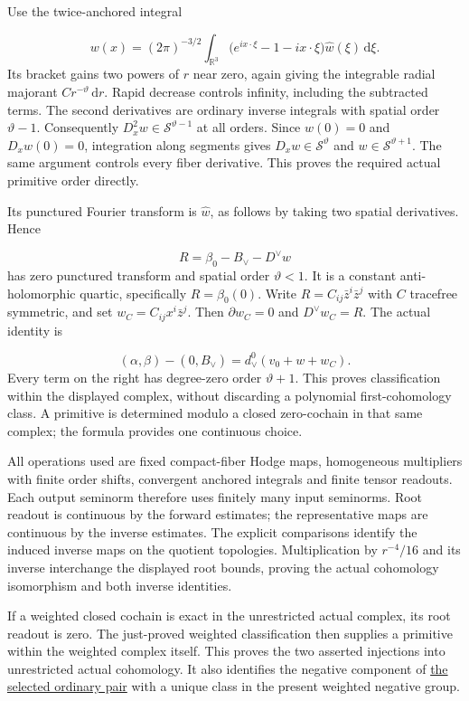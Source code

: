 \documentclass[
  english,
  11pt,
  reqno]{amsart}
\begin{document}
Use the twice-anchored integral

\label{eq:online-dual-twice-anchored-primitive} \[
w(x)=(2\pi)^{-3/2}\int_{\mathbb R^3}
\bigl(e^{ix\cdot\xi}-1-ix\cdot\xi\bigr)
\widehat w(\xi)\,\mathrm d\xi .
\] Its bracket gains two powers of \(r\) near zero, again giving the
integrable radial majorant \(Cr^{-\vartheta}\,\mathrm dr\). Rapid
decrease controls infinity, including the subtracted terms. The second
derivatives are ordinary inverse integrals with spatial order
\(\vartheta-1\). Consequently \(D_x^2w\in\mathscr S^{\vartheta-1}\) at
all orders. Since \(w(0)=0\) and \(D_xw(0)=0\), integration along
segments gives \(D_xw\in\mathscr S^\vartheta\) and
\(w\in\mathscr S^{\vartheta+1}\). The same argument controls every fiber
derivative. This proves the required actual primitive order directly.

Its punctured Fourier transform is \(\widehat w\), as follows by taking
two spatial derivatives. Hence

\label{eq:online-dual-constant-polynomial-residual} \[
R=\beta_0-B_\vee-D^\vee w
\] has zero punctured transform and spatial order \(\vartheta<1\). It is
a constant anti-holomorphic quartic, specifically \(R=\beta_0(0)\).
Write \(R=C_{ij}\bar z^i\bar z^j\) with \(C\) tracefree symmetric, and
set \(w_C=C_{ij}x^i\bar z^j\). Then \(\partial w_C=0\) and
\(D^\vee w_C=R\). The actual identity is

\label{eq:online-dual-actual-comparison-primitive} \[
(\alpha,\beta)-(0,B_\vee)
=d_\vee^0(v_0+w+w_C).
\] Every term on the right has degree-zero order \(\vartheta+1\). This
proves classification within the displayed complex, without discarding a
polynomial first-cohomology class. A primitive is determined modulo a
closed zero-cochain in that same complex; the formula provides one
continuous choice.

All operations used are fixed compact-fiber Hodge maps, homogeneous
multipliers with finite order shifts, convergent anchored integrals and
finite tensor readouts. Each output seminorm therefore uses finitely
many input seminorms. Root readout is continuous by the forward
estimates; the representative maps are continuous by the inverse
estimates. The explicit comparisons identify the induced inverse maps on
the quotient topologies. Multiplication by \(r^{-4}/16\) and its inverse
interchange the displayed root bounds, proving the actual cohomology
isomorphism and both inverse identities.

If a weighted closed cochain is exact in the unrestricted actual
complex, its root readout is zero. The just-proved weighted
classification then supplies a primitive within the weighted complex
itself. This proves the two asserted injections into unrestricted actual
cohomology. It also identifies the negative component of
\hyperref[thm:online-canonical-actual-pair-lift]{the selected ordinary
pair} with a unique class in the present weighted negative group.
\end{document}
